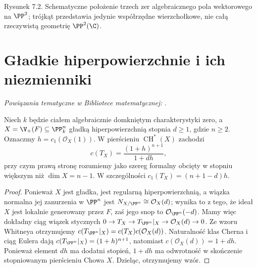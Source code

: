 \begin{center}
\begin{minipage}{\linewidth}
\centering
{}

{\small Rysunek 7.2. Schematyczne położenie trzech zer algebraicznego pola wektorowego na $\PP^2$; trójkąt przedstawia jedynie współrzędne wierzchołkowe, nie całą rzeczywistą geometrię $\PP^2(\C)$.}
\end{minipage}
\end{center}

\section{Gładkie hiperpowierzchnie i ich niezmienniki}
\label{sec:ga7-hypersurfaces}

\noindent\emph{Powiązania tematyczne w Bibliotece matematycznej:} .


\begin{twierdzenie}
\label{tw:ga7-hypersurface-chern}
Niech $k$ będzie ciałem algebraicznie domkniętym
charakterystyki zero, a $X=\V_+(F)\subseteq\PP^n_k$
gładką hiperpowierzchnią stopnia $d\ge1$, gdzie $n\ge2$.
Oznaczmy $h=c_1(\mathcal O_X(1))$.
W pierścieniu $\operatorname{CH}^*(X)$ zachodzi
\[
 c(T_X)=\frac{(1+h)^{n+1}}{1+dh},
\]
przy czym prawą stronę rozumiemy jako szereg formalny
obcięty w stopniu większym niż $\dim X=n-1$.
W szczególności $c_1(T_X)=(n+1-d)h$.
\end{twierdzenie}
\begin{proof}
Ponieważ $X$ jest gładka, jest regularną hiperpowierzchnią,
a wiązka normalna jej zanurzenia w $\PP^n$ jest
$N_{X/\PP^n}\cong\mathcal O_X(d)$; wynika to
z tego, że ideał $X$ jest lokalnie generowany przez $F$,
zaś jego snop to $\mathcal O_{\PP^n}(-d)$.
Mamy więc dokładny ciąg wiązek stycznych
$0\to T_X\to T_{\PP^n}|_X\to\mathcal O_X(d)\to0$.
Ze wzoru Whitneya otrzymujemy
$c(T_{\PP^n}|_X)=c(T_X)c(\mathcal O_X(d))$.
Naturalność klas Cherna i ciąg Eulera dają
$c(T_{\PP^n}|_X)=(1+h)^{n+1}$, natomiast
$c(\mathcal O_X(d))=1+dh$.
Ponieważ element $dh$ ma dodatni stopień, $1+dh$
ma odwrotność w skończenie stopniowanym pierścieniu
Chowa $X$. Dzieląc, otrzymujemy wzór.
\end{proof}

